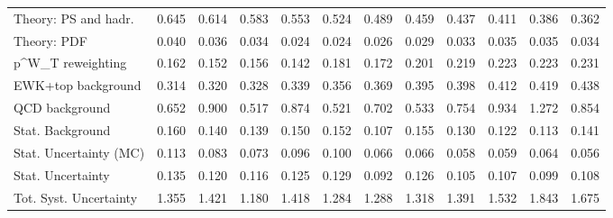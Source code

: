 \begin{tabular}{l|p{0.6cm}p{0.6cm}p{0.6cm}p{0.6cm}p{0.6cm}p{0.6cm}p{0.6cm}p{0.6cm}p{0.6cm}p{0.6cm}p{0.6cm}}
Theory: PS and hadr.                     & 0.645 & 0.614 & 0.583 & 0.553 & 0.524 & 0.489 & 0.459 & 0.437 & 0.411 & 0.386 & 0.362 \\
Theory: PDF                              & 0.040 & 0.036 & 0.034 & 0.024 & 0.024 & 0.026 & 0.029 & 0.033 & 0.035 & 0.035 & 0.034 \\
p^{W}_{T} reweighting                    & 0.162 & 0.152 & 0.156 & 0.142 & 0.181 & 0.172 & 0.201 & 0.219 & 0.223 & 0.223 & 0.231 \\
EWK+top background                       & 0.314 & 0.320 & 0.328 & 0.339 & 0.356 & 0.369 & 0.395 & 0.398 & 0.412 & 0.419 & 0.438 \\
QCD background                           & 0.652 & 0.900 & 0.517 & 0.874 & 0.521 & 0.702 & 0.533 & 0.754 & 0.934 & 1.272 & 0.854 \\
Stat. Background                         & 0.160 & 0.140 & 0.139 & 0.150 & 0.152 & 0.107 & 0.155 & 0.130 & 0.122 & 0.113 & 0.141 \\
Stat. Uncertainty (MC)                   & 0.113 & 0.083 & 0.073 & 0.096 & 0.100 & 0.066 & 0.066 & 0.058 & 0.059 & 0.064 & 0.056 \\
\hline
Stat. Uncertainty                        & 0.135 & 0.120 & 0.116 & 0.125 & 0.129 & 0.092 & 0.126 & 0.105 & 0.107 & 0.099 & 0.108 \\
\hline
Tot. Syst. Uncertainty                   & 1.355 & 1.421 & 1.180 & 1.418 & 1.284 & 1.288 & 1.318 & 1.391 & 1.532 & 1.843 & 1.675 \\
\hline
\end{tabular}
